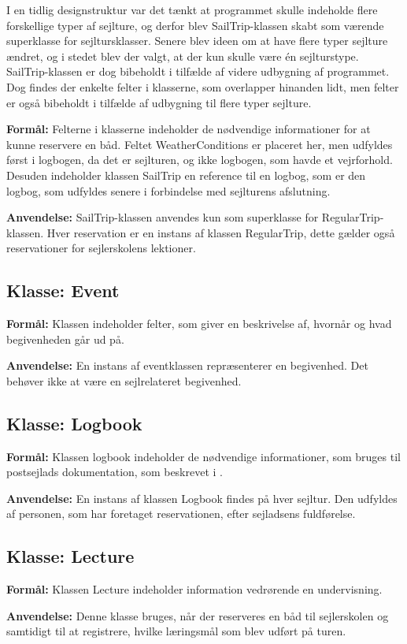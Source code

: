 I en tidlig designstruktur var det tænkt at programmet skulle indeholde flere forskellige typer af sejlture, og derfor blev SailTrip-klassen skabt som værende superklasse for sejltursklasser. 
Senere blev ideen om at have flere typer sejlture ændret, og i stedet blev der valgt, at der kun skulle være én sejlturstype. 
SailTrip-klassen er dog bibeholdt i tilfælde af videre udbygning af programmet.
Dog findes der enkelte felter i klasserne, som overlapper hinanden lidt, men felter er også bibeholdt i tilfælde af udbygning til flere typer sejlture.

\textbf{Formål:}
Felterne i klasserne indeholder de nødvendige informationer for at kunne reservere en båd.
Feltet WeatherConditions er placeret her, men udfyldes først i logbogen, da det er sejlturen, og ikke logbogen, som havde et vejrforhold.
Desuden indeholder klassen SailTrip en reference til en logbog, som er den logbog, som udfyldes senere i forbindelse med sejlturens afslutning.

\textbf{Anvendelse:}
SailTrip-klassen anvendes kun som superklasse for RegularTrip-klassen. 
Hver reservation er en instans af klassen RegularTrip, dette gælder også reservationer for sejlerskolens lektioner.

\subsection*{Klasse: Event}

\textbf{Formål:} 
Klassen indeholder felter, som giver en beskrivelse af, hvornår og hvad begivenheden går ud på. 

\textbf{Anvendelse:}
En instans af eventklassen repræsenterer en begivenhed. 
Det behøver ikke at være en sejlrelateret begivenhed.

\subsection*{Klasse: Logbook}

\textbf{Formål:}
Klassen logbook indeholder de nødvendige informationer, som bruges til postsejlads dokumentation, som beskrevet i .

\textbf{Anvendelse:}
En instans af klassen Logbook findes på hver sejltur. 
Den udfyldes af personen, som har foretaget reservationen, efter sejladsens fuldførelse. 

\subsection*{Klasse: Lecture}

\textbf{Formål:}
Klassen Lecture indeholder information vedrørende en undervisning. 

\textbf{Anvendelse:}
Denne klasse bruges, når der reserveres en båd til sejlerskolen og samtidigt til at registrere, hvilke læringsmål som blev udført på turen. 
